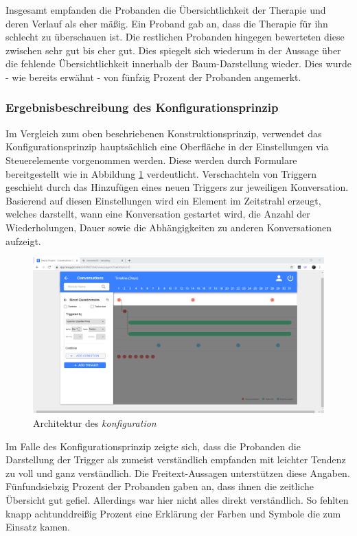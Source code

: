 Insgesamt empfanden die Probanden die Übersichtlichkeit der Therapie und deren Verlauf als eher mäßig. Ein Proband gab an, dass die Therapie für ihn schlecht zu überschauen ist. Die restlichen Probanden hingegen bewerteten diese zwischen sehr gut bis eher gut. Dies spiegelt sich wiederum in der Aussage über die fehlende Übersichtlichkeit innerhalb der Baum-Darstellung wieder. Dies wurde - wie bereits erwähnt - von fünfzig Prozent der Probanden angemerkt. 


\subsubsection{Ergebnisbeschreibung des Konfigurationsprinzip}

Im Vergleich zum oben beschriebenen Konstruktionsprinzip, verwendet das Konfigurationsprinzip hauptsächlich eine Oberfläche in der Einstellungen via Steuerelemente vorgenommen werden. Diese werden durch Formulare bereitgestellt wie in Abbildung \ref{konfiguration} verdeutlicht. Verschachteln von Triggern geschieht durch das Hinzufügen eines neuen Triggers zur jeweiligen Konversation. Basierend auf diesen Einstellungen wird ein Element im Zeitstrahl erzeugt, welches darstellt, wann eine Konversation gestartet wird, die Anzahl der Wiederholungen, Dauer sowie die Abhängigkeiten zu anderen Konversationen aufzeigt. 

\begin{figure}[h]
\centering
\includegraphics[width=1\textwidth]{pictures/konfiguration}
\caption{Architektur des \emph{konfiguration}}
\label{konfiguration}
\end{figure}

Im Falle des Konfigurationsprinzip zeigte sich, dass die Probanden die Darstellung der Trigger als zumeist verständlich empfanden mit leichter Tendenz zu voll und ganz verständlich. Die Freitext-Aussagen unterstützen diese Angaben. Fünfundsiebzig Prozent der Probanden gaben an, dass ihnen die zeitliche Übersicht gut gefiel. Allerdings war hier nicht alles direkt verständlich. So fehlten knapp achtunddreißig Prozent eine Erklärung der Farben und Symbole die zum Einsatz kamen.

